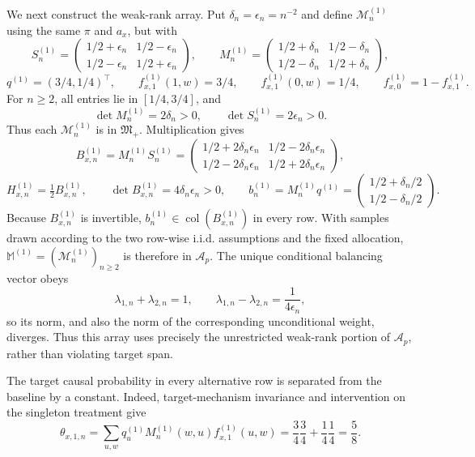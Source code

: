 We next construct the weak-rank array.  Put \(\delta_n=\epsilon_n=n^{-2}\) and define \(\mathcal M^{(1)}_n\) using the same \(\pi\) and \(a_x\), but with
\[
S^{(1)}_n=
\begin{pmatrix}
1/2+\epsilon_n&1/2-\epsilon_n\\
1/2-\epsilon_n&1/2+\epsilon_n
\end{pmatrix},\qquad
M^{(1)}_n=
\begin{pmatrix}
1/2+\delta_n&1/2-\delta_n\\
1/2-\delta_n&1/2+\delta_n
\end{pmatrix},
\]
\[
q^{(1)}=(3/4,1/4)^{\top},\qquad
f^{(1)}_{x,1}(1,w)=3/4,\qquad
f^{(1)}_{x,1}(0,w)=1/4,\qquad
f^{(1)}_{x,0}=1-f^{(1)}_{x,1}.
\]
For \(n\ge2\), all entries lie in \([1/4,3/4]\), and
\[
\det M^{(1)}_n=2\delta_n>0,\qquad
\det S^{(1)}_n=2\epsilon_n>0.
\]
Thus each \(\mathcal M^{(1)}_n\) is in \(\mathfrak M_{+}\).  Multiplication gives
\[
B^{(1)}_{x,n}=M^{(1)}_nS^{(1)}_n=
\begin{pmatrix}
1/2+2\delta_n\epsilon_n&1/2-2\delta_n\epsilon_n\\
1/2-2\delta_n\epsilon_n&1/2+2\delta_n\epsilon_n
\end{pmatrix},
\]
\[
H^{(1)}_{x,n}=\tfrac12B^{(1)}_{x,n},\qquad
\det B^{(1)}_{x,n}=4\delta_n\epsilon_n>0,\qquad
b^{(1)}_n=M^{(1)}_nq^{(1)}=
\begin{pmatrix}1/2+\delta_n/2\\1/2-\delta_n/2\end{pmatrix}.
\]
Because \(B^{(1)}_{x,n}\) is invertible, \(b^{(1)}_n\in\operatorname{col}(B^{(1)}_{x,n})\) in every row.  With samples drawn according to the two row-wise i.i.d. assumptions and the fixed allocation, \(\mathbb M^{(1)}=(\mathcal M^{(1)}_n)_{n\ge2}\) is therefore in \(\mathcal A_p\).  The unique conditional balancing vector obeys
\[
\lambda_{1,n}+\lambda_{2,n}=1,\qquad
\lambda_{1,n}-\lambda_{2,n}=\frac{1}{4\epsilon_n},
\]
so its norm, and also the norm of the corresponding unconditional weight, diverges.  Thus this array uses precisely the unrestricted weak-rank portion of \(\mathcal A_p\), rather than violating target span.

The target causal probability in every alternative row is separated from the baseline by a constant.  Indeed, target-mechanism invariance and intervention on the singleton treatment give
\[
\theta_{x,1,n}
=\sum_{u,w}q^{(1)}_uM^{(1)}_n(w,u)f^{(1)}_{x,1}(u,w)
=\frac34\frac34+\frac14\frac14
=\frac58.
\]

